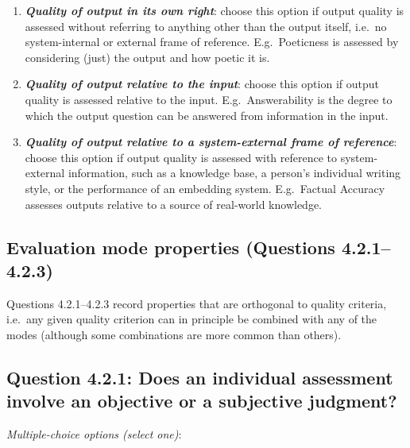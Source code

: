 \documentclass[11pt,a4paper]{article}
\newcommand{\egcvalue}[1]{\textbf{\textit{#1}}}
\begin{document}
\begin{enumerate}[itemsep=0cm,leftmargin=0.5cm,label={\LARGE $\circ$}]
    \item \egcvalue{Quality of output in its own right}: choose this option if output quality is assessed without referring to anything other than the output itself, i.e.\ no  system-internal or external frame of reference. E.g.\ Poeticness is assessed by considering (just) the output and how poetic it is. 
    \item \egcvalue{Quality of output relative to the input}:  choose this option if output quality is assessed  relative to the input. E.g.\ Answerability is the degree to which the output question can be answered from information in the input.
    \item \egcvalue{Quality of output relative to a system-external frame of reference}: choose this option if output quality is assessed with reference to system-external information, such as a knowledge base, a person’s individual writing style, or the performance of an embedding system. E.g.\ Factual Accuracy assesses outputs relative to a source of real-world knowledge.
\end{enumerate}
    

    
\subsection{Evaluation mode properties (Questions 4.2.1--4.2.3)}

Questions 4.2.1--4.2.3 record properties that are orthogonal to quality criteria, i.e.\ any given quality criterion can in principle be combined with any of the modes (although some combinations are more common than others). 

\vspace{-.3cm}
\subsection*{Question 4.2.1: Does an individual assessment involve an objective or a subjective judgment?}

\noindent\textit{Multiple-choice options (select one)}:  
\vspace{-.1cm}
\end{document}
